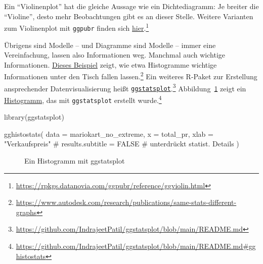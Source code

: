 \documentclass[
  letterpaper,
]{scrbook}
\newenvironment{Shaded}{\begin{snugshade}}{\end{snugshade}}
\newcommand{\AttributeTok}[1]{\textcolor[rgb]{0.40,0.45,0.13}{#1}}
\newcommand{\CommentTok}[1]{\textcolor[rgb]{0.37,0.37,0.37}{#1}}
\newcommand{\FunctionTok}[1]{\textcolor[rgb]{0.28,0.35,0.67}{#1}}
\newcommand{\NormalTok}[1]{\textcolor[rgb]{0.00,0.23,0.31}{#1}}
\newcommand{\StringTok}[1]{\textcolor[rgb]{0.13,0.47,0.30}{#1}}
\theoremstyle{definition}
\theoremstyle{definition}
\theoremstyle{definition}
\theoremstyle{remark}
\begin{document}
Ein ``Violinenplot'' hat die gleiche Aussage wie ein Dichtediagramm: Je
breiter die ``Violine'', desto mehr Beobachtungen gibt es an dieser
Stelle. Weitere Varianten zum Violinenplot mit \texttt{ggpubr} finden
sich
\href{https://rpkgs.datanovia.com/ggpubr/reference/ggviolin.html}{hier}.\footnote{\url{https://rpkgs.datanovia.com/ggpubr/reference/ggviolin.html}}

Übrigens sind Modelle -- und Diagramme sind Modelle -- immer eine
Vereinfachung, lassen also Informationen weg. Manchmal auch wichtige
Informationen.
\href{https://www.autodesk.com/research/publications/same-stats-different-graphs}{Dieses
Beispiel} zeigt, wie etwa Histogramme wichtige Informationen unter den
Tisch fallen lassen.\footnote{\url{https://www.autodesk.com/research/publications/same-stats-different-graphs}}
Ein weiteres R-Paket zur Erstellung ansprechender Datenvisualisierung
heißt
\href{https://github.com/IndrajeetPatil/ggstatsplot/blob/main/README.md}{\texttt{ggstatsplot}}.\footnote{\url{https://github.com/IndrajeetPatil/ggstatsplot/blob/main/README.md}}
Abbildung~\ref{fig-ggstatsplot} zeigt ein
\href{https://github.com/IndrajeetPatil/ggstatsplot/blob/main/README.md\#gghistostats}{Histogramm},
das mit \texttt{ggstatsplot} erstellt wurde.\footnote{\url{https://github.com/IndrajeetPatil/ggstatsplot/blob/main/README.md\#gghistostats}}

\begin{Shaded}
\begin{Highlighting}[]
\FunctionTok{library}\NormalTok{(ggstatsplot)}

\FunctionTok{gghistostats}\NormalTok{(}
  \AttributeTok{data       =}\NormalTok{ mariokart\_no\_extreme,}
  \AttributeTok{x          =}\NormalTok{ total\_pr,}
  \AttributeTok{xlab       =} \StringTok{"Verkaufspreis"} 
  \CommentTok{\# results.subtitle = FALSE   \# unterdrückt statist. Details}
\NormalTok{)}
\end{Highlighting}
\end{Shaded}

\begin{figure}[H]


\caption{\label{fig-ggstatsplot}Ein Histogramm mit ggstatsplot}

\end{figure}%
\end{document}
